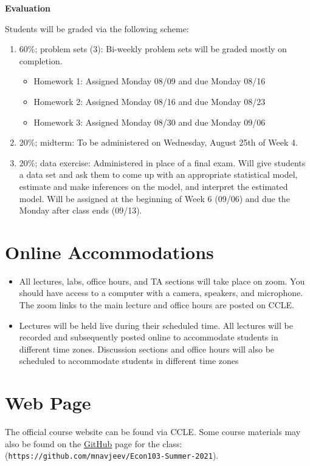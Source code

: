 \documentclass[10pt]{article}
\begin{document}
{\bf \large Evaluation}

Students will be graded via the following scheme:
\begin{enumerate}
  \item 60\%; problem sets (3): Bi-weekly problem sets will be graded mostly on completion.
  \begin{itemize}
  	\item Homework 1: Assigned Monday 08/09 and due Monday 08/16
	\item Homework 2: Assigned Monday 08/16 and due Monday 08/23
	\item Homework 3: Assigned Monday 08/30 and due Monday 09/06
  \end{itemize}
  \item 20\%; midterm: To be administered on Wednesday, August 25th of Week 4. 
  \item 20\%; data exercise: Administered in place of a final exam. Will give students a data set and ask them to come up with an appropriate statistical model, estimate and make inferences on the model, and interpret the estimated model. Will be assigned at the beginning of Week 6 (09/06) and due the Monday after class ends (09/13).
\end{enumerate}

\section*{Online Accommodations}

\begin{itemize}
	\renewcommand{\labelitemi}{\(\rhd\)}
	\item All lectures, labs, office hours, and TA sections will take place on zoom. You should have access to a computer with a camera, speakers, and microphone. The zoom links to the main lecture and office hours are posted on CCLE. 
	\item Lectures will be held live during their scheduled time. All lectures will be recorded and subsequently posted online to accommodate students in different time zones. Discussion sections and office hours will also be scheduled to accommodate students in different time zones
\end{itemize}

\section*{Web Page}

The official course website can be found via CCLE. Some course materials may also be found on the \href{https://github.com/mnavjeev/Econ103-Summer-2021}{GitHub} page for the class: (\verb|https://github.com/mnavjeev/Econ103-Summer-2021|). 
\end{document}
